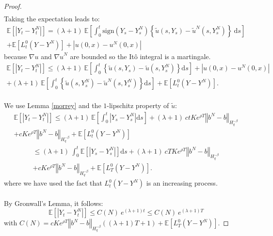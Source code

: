 \documentclass[12pt]{article}
\newcommand{\norme}[1]{\left\Vert #1\right\Vert}
\newcommand{\E}{\mathbb{E}}
\newcommand{\di}{\mathrm{d}}
\begin{document}
\begin{proof}
\begin{multline*}
     \end{multline*}    
    Taking the expectation leads to:
    \begin{multline*}
    \E\left[\left|Y_t-Y_t^N\right|\right] = (\lambda + 1)\ \E\left[\int_0^t\mathrm{sign}(Y_s-Y_s^N)\left\{\widetilde{u}\left(s,Y_s\right)-\widetilde{u}^N\left(s,Y_s^N\right)\right\}\ \di s\right]\\ + \E \left[L_t^0(Y-Y^N)\right] + \left|u(0,x)-u^N(0,x)\right|
    \end{multline*}
    because ${\nabla u}$ and ${\nabla u}^N$ are bounded so the Itô integral is a martingale.    
    \begin{multline*}
    \E\left[\left|Y_t-Y_t^N\right|\right]\leq (\lambda + 1)\ \E\left[\int_0^t\left\{\widetilde{u}\left(s,Y_s\right)-\widetilde{u}\left(s,Y_s^N\right)\right\} \di s\right]+ \left|u(0,x)-u^N(0,x)\right|\\ +(\lambda + 1)\ \E\left[\int_0^t\left\{\widetilde{u}\left(s,Y_s^N\right)-\widetilde{u}^N\left(s,Y_s^N\right)\right\} \di s\right] + \E \left[L_t^0(Y-Y^N)\right].
    \end{multline*}    
    \paragraph{}
    We use Lemma \ref{morrey} and the $1$-lipschitz property of $\widetilde{u}$:
    \begin{multline*}
    \E\left[\left|Y_t-Y_t^N\right|\right]\leq (\lambda + 1)\ \E\left[\int_0^t\left|Y_s-Y_s^N\right| \di s\right] +(\lambda + 1)\ ctKe^{\rho T}\norme{b^N-b}_{H^{-\beta}_{q}}\\+ cKe^{\rho T}\norme{b^N-b}_{H^{-\beta}_{q}} + \E \left[L_t^0(Y-Y^N)\right]
    \end{multline*}    
    \begin{multline*}
    \leq (\lambda + 1)\ \int_0^t\E\left[\left|Y_s-Y_s^N\right|\right] \di s + (\lambda + 1)\ cTKe^{\rho T}\norme{b^N-b}_{H^{-\beta}_{q}}\\+ cKe^{\rho T}\norme{b^N-b}_{H^{-\beta}_{q}} + \E \left[L_T^0(Y-Y^N)\right].
    \end{multline*}
    where we have used the fact that $L_t^0(Y-Y^N)$ is an increasing process.    
    \paragraph{}
    By Gronwall's Lemma, it follows:
    \begin{equation}\label{gronwall}
    \E\left[\left|Y_t-Y_t^N\right|\right] \leq C(N)\ e^{(\lambda + 1)t}\leq C(N)\ e^{(\lambda + 1)T}
    \end{equation}
    with $C(N) = cKe^{\rho T}\norme{b^N-b}_{H^{-\beta}_{q}}((\lambda + 1)T + 1) + \E \left[L_T^0(Y-Y^N)\right].$      
    

\end{proof}
\end{document}
